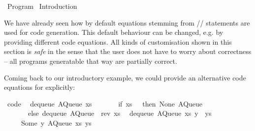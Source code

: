 %
\begin{isabellebody}%
\def\isabellecontext{Program}%
%
\isadelimtheory
%
\endisadelimtheory
%
\isatagtheory
{}\isamarkupfalse%
\ Program\isanewline
{}\ Introduction\isanewline
{}%
\endisatagtheory
{\isafoldtheory}%
%
\isadelimtheory
%
\endisadelimtheory
%
\isamarkuptrue%
%
\isamarkuptrue%
%
\begin{isamarkuptext}%
We have already seen how by default equations stemming from
  \hyperlink{command.definition}{\mbox{}}/\hyperlink{command.primrec}{\mbox{}}/\hyperlink{command.fun}{\mbox{}}
  statements are used for code generation.  This default behaviour
  can be changed, e.g. by providing different code equations.
  All kinds of customisation shown in this section is \emph{safe}
  in the sense that the user does not have to worry about
  correctness -- all programs generatable that way are partially
  correct.%
\end{isamarkuptext}%
\isamarkuptrue%
%
\isamarkuptrue%
%
\begin{isamarkuptext}%
Coming back to our introductory example, we
  could provide an alternative code equations for 
  explicitly:%
\end{isamarkuptext}%
\isamarkuptrue%
%
\isadelimquote
%
\endisadelimquote
%
\isatagquote
{}\isamarkupfalse%
\ {\isacharbrackleft}code{\isacharbrackright}{\isacharcolon}\isanewline
\ \ {\isachardoublequoteopen}dequeue\ {\isacharparenleft}AQueue\ xs\ {\isacharbrackleft}{\isacharbrackright}{\isacharparenright}\ {\isacharequal}\isanewline
\ \ \ \ \ {\isacharparenleft}if\ xs\ {\isacharequal}\ {\isacharbrackleft}{\isacharbrackright}\ then\ {\isacharparenleft}None{\isacharcomma}\ AQueue\ {\isacharbrackleft}{\isacharbrackright}\ {\isacharbrackleft}{\isacharbrackright}{\isacharparenright}\isanewline
\ \ \ \ \ \ \ else\ dequeue\ {\isacharparenleft}AQueue\ {\isacharbrackleft}{\isacharbrackright}\ {\isacharparenleft}rev\ xs{\isacharparenright}{\isacharparenright}{\isacharparenright}{\isachardoublequoteclose}\isanewline
\ \ {\isachardoublequoteopen}dequeue\ {\isacharparenleft}AQueue\ xs\ {\isacharparenleft}y\ {\isacharhash}\ ys{\isacharparenright}{\isacharparenright}\ {\isacharequal}\isanewline
\ \ \ \ \ {\isacharparenleft}Some\ y{\isacharcomma}\ AQueue\ xs\ ys{\isacharparenright}{\isachardoublequoteclose}\isanewline

\end{isabellebody}
